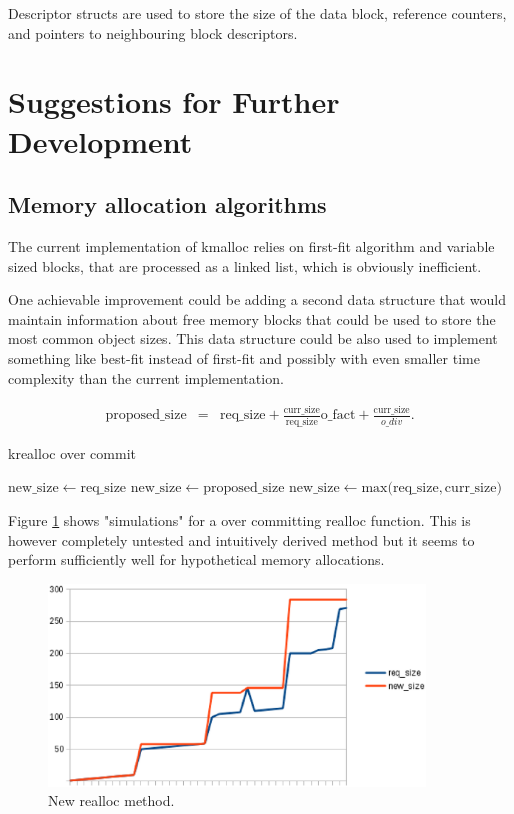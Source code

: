 Descriptor structs are used to store the size of the data block, reference counters,
and pointers to neighbouring block descriptors.


\section{Suggestions for Further Development}

\subsection{Memory allocation algorithms}

The current implementation of kmalloc relies on first-fit algorithm and variable
sized blocks, that are processed as a linked list, which is obviously inefficient.

One achievable improvement could be adding a second data structure that would
maintain information about free memory blocks that could be used to store the
most common object sizes. This data structure could be also used to implement
something like best-fit instead of first-fit and possibly with even smaller
time complexity than the current implementation.

\begin{eqnarray}
\mathrm{proposed\_size} &=& \mathrm{req\_size}
  + \frac{\mathrm{curr\_size}}{\mathrm{req\_size}} \mathrm{o\_fact}
  + \frac{\mathrm{curr\_size}}{o\_div}.
\end{eqnarray}

\begin{algorithm}
  \caption{krealloc over commit}
  \label{algo:realloc_oc}
  \begin{algorithmic}
        \State $\mathrm{new\_size} \gets \mathrm{req\_size}$
      \Else
          \State $\mathrm{new\_size} \gets \mathrm{proposed\_size}$
        \Else
          \State $\mathrm{new\_size} \gets \mathrm{max(req\_size, curr\_size})$
        \EndIf
      \EndIf
  \end{algorithmic}
\end{algorithm}

Figure \ref{figure:realloc} shows "simulations" for a over committing realloc
function. This is however completely untested and intuitively derived method
but it seems to perform sufficiently well for hypothetical memory allocations.

\begin{figure}
  \center
  \includegraphics[width=10cm]{pics/realloc}
  \caption{New realloc method.}
  \label{figure:realloc}
\end{figure}
